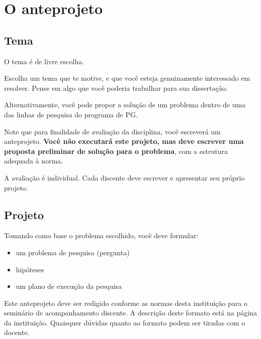 \documentclass[a4paper]{article}
\begin{document}
\section{O anteprojeto}

\subsection{Tema}

O tema é de livre escolha.

Escolha um tema que te motive, e que você esteja genuinamente interessado em resolver.
Pense em algo que você poderia trabalhar para sua dissertação.

Alternativamente, você pode propor a solução de um problema dentro de uma das linhas de pesquisa do programa de PG.

Note que para finalidade de avaliação da disciplina, você escreverá um anteprojeto. {\bf Você não executará este projeto, mas deve escrever uma proposta preliminar de solução para o problema}, com a estrutura adequada à norma.

A avaliação é individual. Cada discente deve escrever e apresentar seu próprio projeto.

\subsection{Projeto}

Tomando como base o problema escolhido, você deve formular:

\begin{itemize}
\item um problema de pesquisa (pergunta)
\item hipóteses
\item um plano de execução da pesquisa
\end{itemize}

Este anteprojeto deve ser redigido conforme as normas desta instituição
para o seminário de acompanhamento discente. A
descrição deste formato está na página da instituição. Quaisquer
dúvidas quanto ao formato podem ser tiradas com o docente.

\end{document}
